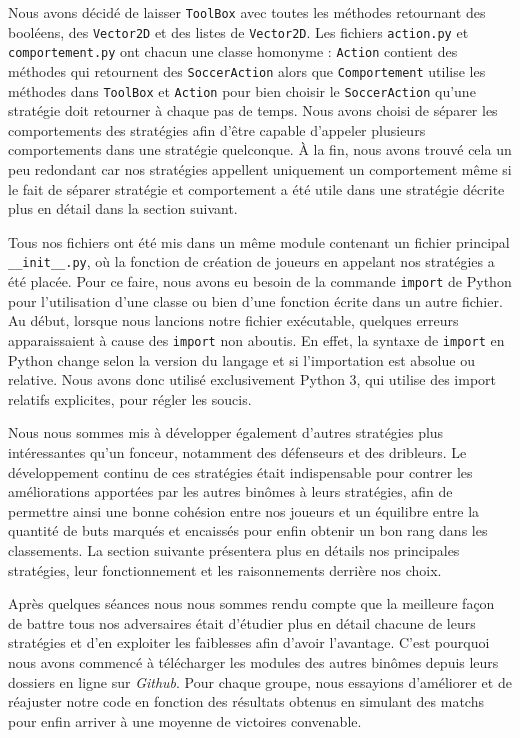 \documentclass[a4paper,12pt]{article}
\begin{document}
Nous avons décidé de laisser \texttt{ToolBox} avec toutes les méthodes retournant des booléens, des \texttt{Vector2D} et des listes de \texttt{Vector2D}. Les fichiers \texttt{action.py} et \texttt{comportement.py} ont chacun une classe homonyme : \texttt{Action} contient des méthodes qui retournent des \texttt{SoccerAction} alors que \texttt{Comportement} utilise les méthodes dans \texttt{ToolBox} et \texttt{Action} pour bien choisir le \texttt{SoccerAction} qu'une stratégie doit retourner à chaque pas de temps. Nous avons choisi de séparer les comportements des stratégies afin d’être capable d’appeler plusieurs comportements dans une stratégie quelconque. À la fin, nous avons trouvé cela un peu redondant car nos stratégies appellent uniquement un comportement même si le fait de séparer stratégie et comportement a été utile dans une stratégie décrite plus en détail dans la section suivant.

Tous nos fichiers ont été mis dans un même module contenant un fichier principal \texttt{\_\_init\_\_.py}, où la fonction de création de joueurs en appelant nos stratégies a été placée. Pour ce faire, nous avons eu besoin de la commande \texttt{import} de Python pour l'utilisation d’une classe ou bien d’une fonction écrite dans un autre fichier. Au début, lorsque nous lancions notre fichier exécutable, quelques erreurs apparaissaient à cause des \texttt{import} non aboutis. En effet, la syntaxe de \texttt{import} en Python change selon la version du langage et si l'importation est absolue ou relative. Nous avons donc utilisé exclusivement Python 3, qui utilise des import relatifs explicites, pour régler les soucis.

Nous nous sommes mis à développer également d’autres stratégies plus intéressantes qu’un fonceur, notamment des défenseurs et des dribleurs. Le développement continu de ces stratégies était indispensable pour contrer les améliorations apportées par les autres binômes à leurs stratégies, afin de permettre ainsi une bonne cohésion entre nos joueurs et un équilibre entre la quantité de buts marqués et encaissés pour enfin obtenir un bon rang dans les classements. La section suivante présentera plus en détails nos principales stratégies, leur fonctionnement et les raisonnements derrière nos choix.

Après quelques séances nous nous sommes rendu compte que la meilleure façon de battre tous nos adversaires était d’étudier plus en détail chacune de leurs stratégies et d’en exploiter les faiblesses afin d'avoir l’avantage. C’est pourquoi nous avons commencé à télécharger les modules des autres binômes depuis leurs dossiers en ligne sur \emph{Github}. Pour chaque groupe, nous essayions d’améliorer et de réajuster notre code en fonction des résultats obtenus en simulant des matchs pour enfin arriver à une moyenne de victoires convenable. 
\end{document}
